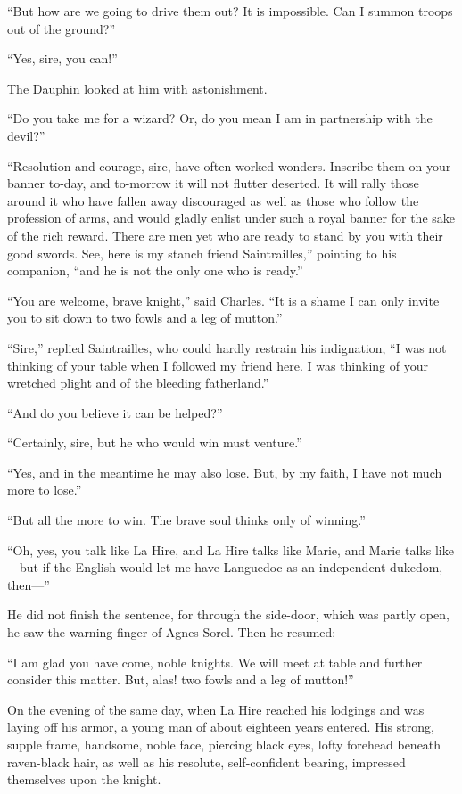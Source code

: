 ``But how are we going to drive them out? It is impossible. Can I summon
troops out of the ground?''

``Yes, sire, you can!''

The Dauphin looked at him with astonishment.

``Do you take me for a wizard? Or, do you mean I am in partnership with
the devil?''

``Resolution and courage, sire, have often worked wonders. Inscribe them
on your banner to-day, and to-morrow it will not flutter deserted. It
will rally those around it who have fallen away discouraged as well as
those who follow the profession of arms, and would gladly enlist under
such a royal banner for the sake of the rich reward. There are men yet
who are ready to stand by you with their good swords. See, here is my
stanch friend Saintrailles,'' pointing to his companion, ``and he is not
the only one who is ready.''

``You are welcome, brave knight,'' said Charles. ``It is a shame I can
only invite you to sit down to two fowls and a leg of mutton.''

``Sire,'' replied Saintrailles, who could hardly restrain his
indignation, ``I was not thinking of your table when I followed my
friend here. I was thinking of your wretched plight and of the bleeding
fatherland.''

``And do you believe it can be helped?''

``Certainly, sire, but he who would win must venture.''

``Yes, and in the meantime he may also lose. But, by my faith, I have
not much more to lose.''

``But all the more to win. The brave soul thinks only of winning.''

``Oh, yes, you talk like La Hire, and La Hire talks like Marie, and
Marie talks like---but if the English would let me have Languedoc as an
independent dukedom, then---''

He did not finish the sentence, for through the side-door, which was
partly open, he saw the warning finger of Agnes Sorel. Then he resumed:

``I am glad you have come, noble knights. We will meet at table and
further consider this matter. But, alas! two fowls and a leg of
mutton!''

On the evening of the same day, when La Hire reached his lodgings and
was laying off his armor, a young man of about eighteen years entered.
His strong, supple frame, handsome, noble face, piercing black eyes,
lofty forehead beneath raven-black hair, as well as his resolute,
self-confident bearing, impressed themselves upon the knight.

